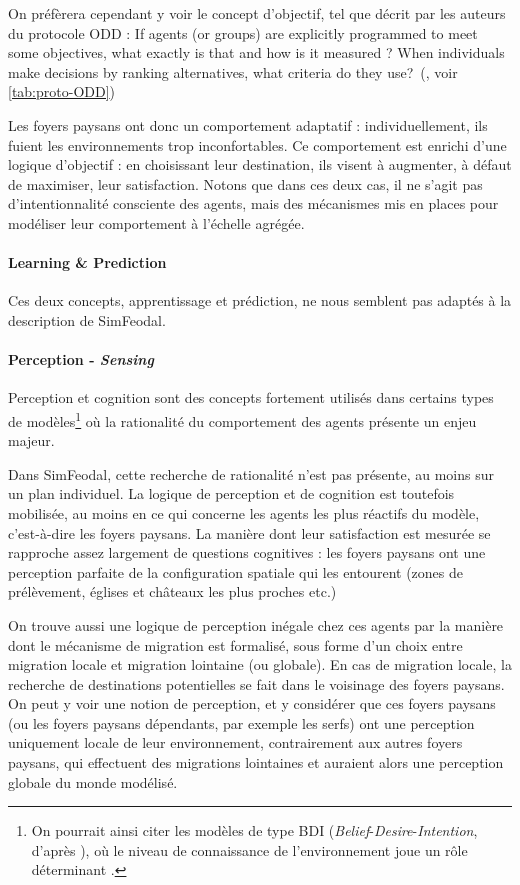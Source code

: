 On préfèrera cependant y voir le concept d'\og objectif\fg{}, tel que décrit par les auteurs du protocole ODD : \og If agents (or groups) are explicitly programmed to meet some objectives, what exactly is that and how is it measured ? When individuals make decisions by ranking alternatives, what criteria do they use?\fg{}~(\cite[p. 353]{grimm_documenting_2017}, voir \cref{tab:proto-ODD})

Les foyers paysans ont donc un comportement adaptatif : individuellement, ils fuient les environnements trop inconfortables.
Ce comportement est enrichi d'une logique d'objectif : en choisissant leur destination, ils visent à augmenter, à défaut de maximiser, leur satisfaction.
Notons que dans ces deux cas, il ne s'agit pas d'intentionnalité consciente des agents, mais des mécanismes mis en places pour modéliser leur comportement à l'échelle agrégée.

\paragraph{Learning \& Prediction} Ces deux concepts, apprentissage et prédiction, ne nous semblent pas adaptés à la description de SimFeodal.

\paragraph{Perception - \textit{Sensing}}
Perception et cognition sont des concepts fortement utilisés dans certains types de modèles\footnote{
	On pourrait ainsi citer les modèles de type \og BDI\fg{} (\textit{Belief}-\textit{Desire}-\textit{Intention}, d'après \cite{bratman1988plans}), où le niveau de connaissance de l'environnement joue un rôle déterminant \autocite[183--184]{crooks_agent-based_2019}.
} où la rationalité du comportement des agents présente un enjeu majeur.

Dans SimFeodal, cette recherche de rationalité n'est pas présente, au moins sur un plan individuel.
La logique de perception et de cognition est toutefois mobilisée, au moins en ce qui concerne les agents les plus réactifs du modèle, c'est-à-dire les foyers paysans.
La manière dont leur satisfaction est mesurée se rapproche assez largement de questions cognitives : les foyers paysans ont une perception parfaite de la configuration spatiale qui les entourent (zones de prélèvement, églises et châteaux les plus proches etc.)

On trouve aussi une logique de perception inégale chez ces agents par la manière dont le mécanisme de migration est formalisé, sous forme d'un choix entre migration locale et migration lointaine (ou globale).
En cas de migration locale, la recherche de destinations potentielles se fait dans le voisinage des foyers paysans.
On peut y voir une notion de perception, et y considérer que ces foyers paysans (ou les foyers paysans \og dépendants\fg{}, par exemple les serfs) ont une perception uniquement locale de leur environnement, contrairement aux autres foyers paysans, qui effectuent des migrations lointaines et auraient alors une perception globale du monde modélisé.

